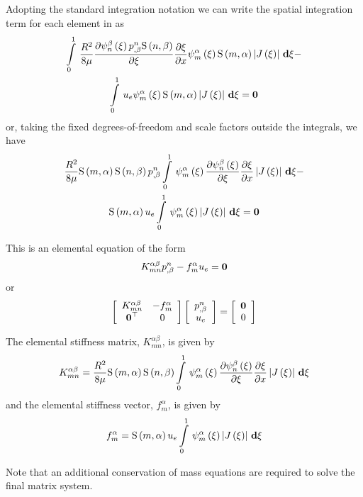 Adopting the standard integration notation we can write the spatial
integration term for each element in  as
\begin{multline}
  \gint{0}{1}{\frac{R^{2}}{8\mu}\delby{\gbfn{n}{\beta}{\xi}\nodedof{p}{n}{\beta}\gsf{n}{\beta}}{\xi}
    \delby{\xi}{x}\gbfn{m}{\alpha}{\xi}\gsf{m}{\alpha}\abs{\fnof{J}{\xi}}}{\xi}- \\
  \gint{0}{1}{\elementdof{u}{e}\gbfn{m}{\alpha}{\xi}\gsf{m}{\alpha}\abs{\fnof{J}{\xi}}}{\xi}=\vectr{0}
  \label{eqn:Poiseullefemform1}
\end{multline}
or, taking the fixed degrees-of-freedom and scale factors outside the integrals, we have
\begin{multline}
  \frac{R^{2}}{8\mu}\gsf{m}{\alpha}\gsf{n}{\beta}\nodedof{p}{n}{\beta}\gint{0}{1}{\gbfn{m}{\alpha}{\xi}
    \delby{\gbfn{n}{\beta}{\xi}}{\xi}\delby{\xi}{x}\abs{\fnof{J}{\xi}}}{\xi}- \\
  \gsf{m}{\alpha}\elementdof{u}{e}\gint{0}{1}{\gbfn{m}{\alpha}{\xi}\abs{\fnof{J}{\xi}}}{\xi}=\vectr{0}
  \label{eqn:Poiseullefemform2}
\end{multline}

This is an elemental equation of the form
\begin{equation}
  K^{\alpha\beta}_{mn}  {p}^{n} _{,\beta} -f^{\alpha}_{m} u_{e} =\boldsymbol{0}
\end{equation}
or
\begin{equation}
  \left[ \begin{array}{cc}
      K^{\alpha\beta}_{mn} & -f^{\alpha}_{m} \\
       {\boldsymbol{0}}^{ \top }  & 0
    \end{array} \right] \left[ \begin{array}{c}
        {p}^{n} _{,\beta}  \\
       u_{e} 
    \end{array} \right] =  \left[ \begin{array}{c}
      \boldsymbol{0} \\
      0
    \end{array} \right]
\end{equation}

The elemental stiffness matrix, $K^{\alpha\beta}_{mn}$, is given by
\begin{equation}
  K^{\alpha\beta}_{mn}=\frac{R^{2}}{8\mu}\gsf{m}{\alpha}\gsf{n}{\beta}
  \gint{0}{1}{\gbfn{m}{\alpha}{\xi}\delby{\gbfn{n}{\beta}{\xi}}{\xi}\delby{\xi}{x}
    \abs{\fnof{J}{\xi}}}{\xi}
  \label{eqn:elementalfemlhs1}
\end{equation}
and the elemental stiffness vector, $f^{\alpha}_{m}$, is given by
\begin{equation}
  f^{\alpha}_{m}=\gsf{m}{\alpha}\elementdof{u}{e}\gint{0}{1}{\gbfn{m}{\alpha}{\xi}
    \abs{\fnof{J}{\xi}}}{\xi}
  \label{eqn:elementalfemlhs2}
\end{equation}

Note that an additional conservation of mass equations are required to solve
the final matrix system.
